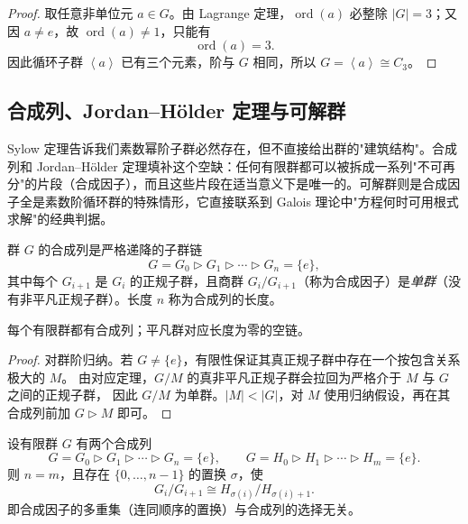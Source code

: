 \begin{proof}
取任意非单位元 $a\in G$。由 Lagrange 定理，$\operatorname{ord}(a)$ 必整除 $|G|=3$；又因 $a\neq e$，故 $\operatorname{ord}(a)\neq1$，只能有
\[
\operatorname{ord}(a)=3.
\]
因此循环子群 $\left\langle a\right\rangle$ 已有三个元素，阶与 $G$ 相同，所以 $G=\left\langle a\right\rangle\cong C_3$。
\end{proof}
\par
\subsection{合成列、Jordan--H\"older 定理与可解群}
\label{sec:composition-solvable}

Sylow 定理告诉我们素数幂阶子群必然存在，但不直接给出群的"建筑结构"。合成列和 Jordan--H\"older 定理填补这个空缺：任何有限群都可以被拆成一系列"不可再分"的片段（合成因子），而且这些片段在适当意义下是唯一的。可解群则是合成因子全是素数阶循环群的特殊情形，它直接联系到 Galois 理论中"方程何时可用根式求解"的经典判据。

\begin{definition}[合成列]
群 $G$ 的合成列是严格递降的子群链
\[
G=G_0\rhd G_1\rhd\cdots\rhd G_n=\{e\},
\]
其中每个 $G_{i+1}$ 是 $G_i$ 的正规子群，且商群 $G_i/G_{i+1}$（称为合成因子）是\emph{单群}（没有非平凡正规子群）。长度 $n$ 称为合成列的长度。
\end{definition}

\begin{proposition}[有限群的合成列存在]
每个有限群都有合成列；平凡群对应长度为零的空链。
\end{proposition}

\begin{proof}
对群阶归纳。若 $G\ne\{e\}$，有限性保证其真正规子群中存在一个按包含关系极大的 $M$。
由对应定理，$G/M$ 的真非平凡正规子群会拉回为严格介于 $M$ 与 $G$ 之间的正规子群，
因此 $G/M$ 为单群。$|M|<|G|$，对 $M$ 使用归纳假设，再在其合成列前加 $G\rhd M$ 即可。
\end{proof}

\begin{theorem}
设有限群 $G$ 有两个合成列
\[
G=G_0\rhd G_1\rhd\cdots\rhd G_n=\{e\},
\qquad
G=H_0\rhd H_1\rhd\cdots\rhd H_m=\{e\}.
\]
则 $n=m$，且存在 $\{0,\dots,n-1\}$ 的置换 $\sigma$，使
\[
G_i/G_{i+1}\cong H_{\sigma(i)}/H_{\sigma(i)+1}.
\]
即合成因子的多重集（连同顺序的置换）与合成列的选择无关。
\label{thm:jordan-holder}
\end{theorem}

